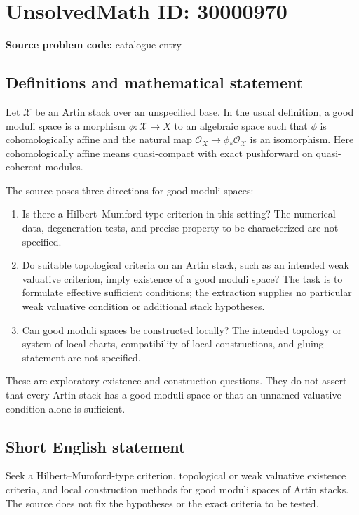 \documentclass[11pt]{article}
\begin{document}
\section*{UnsolvedMath ID: 30000970}
\textbf{Source problem code:} catalogue entry
\subsection{Definitions and mathematical statement}
Let \(\mathcal X\) be an Artin stack over an unspecified base. In the usual definition, a good moduli space is a morphism \(\phi:\mathcal X\to X\) to an algebraic space such that \(\phi\) is cohomologically affine and the natural map \(\mathcal O_X\to\phi_*\mathcal O_{\mathcal X}\) is an isomorphism. Here cohomologically affine means quasi-compact with exact pushforward on quasi-coherent modules.

The source poses three directions for good moduli spaces:
\begin{enumerate}
\item Is there a Hilbert--Mumford-type criterion in this setting? The numerical data, degeneration tests, and precise property to be characterized are not specified.
\item Do suitable topological criteria on an Artin stack, such as an intended weak valuative criterion, imply existence of a good moduli space? The task is to formulate effective sufficient conditions; the extraction supplies no particular weak valuative condition or additional stack hypotheses.
\item Can good moduli spaces be constructed locally? The intended topology or system of local charts, compatibility of local constructions, and gluing statement are not specified.
\end{enumerate}
These are exploratory existence and construction questions. They do not assert that every Artin stack has a good moduli space or that an unnamed valuative condition alone is sufficient.
\subsection{Short English statement}
Seek a Hilbert--Mumford-type criterion, topological or weak valuative existence criteria, and local construction methods for good moduli spaces of Artin stacks. The source does not fix the hypotheses or the exact criteria to be tested.
\end{document}
